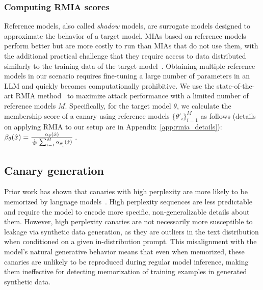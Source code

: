 \subsubsection{Computing RMIA scores}
\label{sec:method_rmia}

Reference models, also called \emph{shadow} models, are surrogate models designed to approximate the behavior of a target model.
%
MIAs based on reference models perform better but are more costly to run than MIAs that do not use them, with the additional practical challenge that they require access to data distributed similarly to the training data of the target model~\citep{shokri2017membership,ye2022enhanced}. Obtaining multiple reference models in our scenario requires fine-tuning a large number of parameters in an LLM and quickly becomes computationally prohibitive. We use the state-of-the-art RMIA method~\citep{zarifzadeh2024low} to maximize attack performance with a limited number of reference models $M$. Specifically, for the target model $\theta$, we calculate the membership score of a canary  using reference models $\{ \theta'_i \}_{i=1}^M$ as follows (details on applying RMIA to our setup are in Appendix~\ref{app:rmia_details}): 
$\beta_\theta({\hat{x}}) = \frac{\alpha_{\theta}({\hat{x}})}{\frac{1}{M} \sum_{i=1}^M \alpha_{\theta'_i}({\hat{x}})} \,$.

\subsection{Canary generation}
\label{sec:method_canaries}

Prior work has shown that canaries with high perplexity are more likely to be memorized by language models~\citep{meeuscopyright}.
High perplexity sequences are less predictable and require the model to encode more specific, non-generalizable details about them.
However, high perplexity canaries are not necessarily more susceptible to leakage via synthetic data generation, as they are outliers in the text distribution when conditioned on a given in-distribution prompt.
This misalignment with the model's natural generative behavior means that even when memorized, these canaries are unlikely to be reproduced during regular model inference, making them ineffective for detecting memorization of training examples in generated synthetic data.

